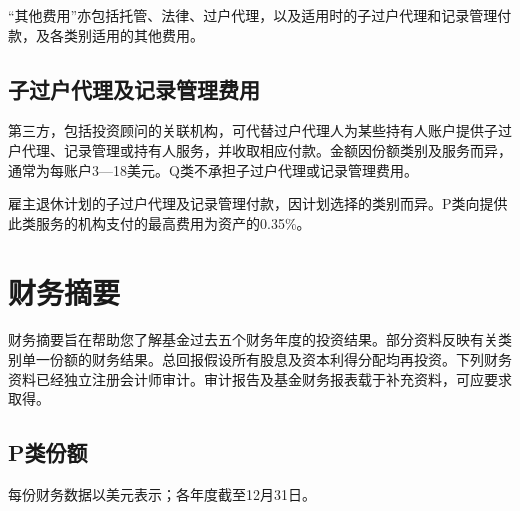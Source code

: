 \documentclass[UTF8,fontset=none,11pt,a4paper]{ctexart}
\begin{document}
“其他费用”亦包括托管、法律、过户代理，以及适用时的子过户代理和记录管理付款，及各类别适用的\allowbreak\mbox{其他费用。}


\subsection*{子过户代理及记录管理费用}
第三方，包括投资顾问的关联机构，可代替过户代理人为某些持有人账户提供子过户代理、记录管理或持有人服务，并收取相应付款。金额因份额类别及服务而异，通常为每账户3—18美元。Q类不承担子过户代理或记录\allowbreak\mbox{管理费用。}


雇主退休计划的子过户代理及记录管理付款，因计划选择的类别而异。P类向提供此类服务的机构支付的最高费用为资产的0.35\%。


\section*{财务摘要}
财务摘要旨在帮助您了解基金过去五个财务年度的投资结果。部分资料反映有关类别单一份额的财务结果。总回报假设所有股息及资本利得分配均再投资。下列财务资料已经独立注册会计师审计。审计报告及基金财务报表载于补充资料，可应\allowbreak\mbox{要求取得。}


\subsection*{P类份额}
每份财务数据以美元表示；各年度截至12月31日。
\end{document}
